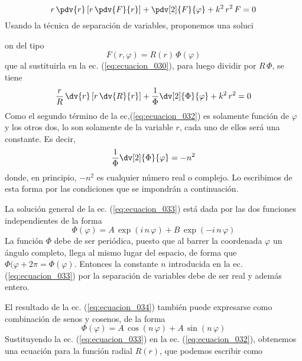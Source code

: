 \begin{equation}
r \, \pdv{r} \left[ r \, \pdv{F}{r} \right] + \pdv[2]{F}{\varphi} + k^{2} \, r^{2} \, F = 0
\label{eq:ecuacion_030}
\end{equation}
Usando la técnica de separación de variables, proponemos una soluci{on del tipo
\begin{equation}
F(r, \varphi) = R(r) \, \Phi(\varphi)
\label{eq:ecuacion_031}
\end{equation}
que al sustituirla en la ec. (\ref{eq:ecuacion_030}), para luego dividir por $R \, \Phi$, se tiene
\begin{equation}
\dfrac{r}{R} \, \dv{r} \left[ r \, \dv{R}{r} \right] + \dfrac{1}{\Phi} \dv[2]{\Phi}{\varphi} + k^{2} \, r^{2} = 0
\label{eq:ecuacion_032}
\end{equation}
Como el segundo término de la ec,(\ref{eq:ecuacion_032}) es solamente función de $\varphi$ y los otros dos, lo son solamente de la variable $r$, cada uno de ellos será una constante. Es decir,
\begin{equation}
\dfrac{1}{\Phi} \dv[2]{\Phi}{\varphi} = -n^{2}
\label{eq:ecuacion_033}
\end{equation}
donde, en principio, $-n^{2}$ es cualquier número real o complejo. Lo escribimos de esta
forma por las condiciones que se impondrán a continuación.
\par
La solución general de la ec. (\ref{eq:ecuacion_033}) está dada por las dos funciones independientes de la forma
\begin{equation}
\Phi(\varphi) = A \, \exp(i \, n \, \varphi) + B \, \exp(- i \, n \, \varphi)
\label{eq:ecuacion_034}
\end{equation}
La función $\Phi$ debe de ser periódica, puesto que al barrer la coordenada $\varphi$ un ángulo
completo, llega al mismo lugar del espacio, de forma que $\Phi(\varphi + 2 \pi = \Phi (\varphi)$. Entonces la constante $n$ introducida en la ec. (\ref{eq:ecuacion_033}) por la separación de variables debe de ser real y además entero.
\par
El resultado de la ec. (\ref{eq:ecuacion_034}) también puede expresarse como combinación de senos y cosenos, de la forma
\begin{equation}
\Phi (\varphi) = A \, \cos (n \, \varphi) + A \, \sin (n \, \varphi)
\label{eq:ecuacion_035}
\end{equation}
Sustituyendo la ec. (\ref{eq:ecuacion_033}) en la ec. (\ref{eq:ecuacion_032}), obtenemos una ecuación para la función radial $R (r)$, que podemos escribir como
\begin{equation}

\end{equation}}
